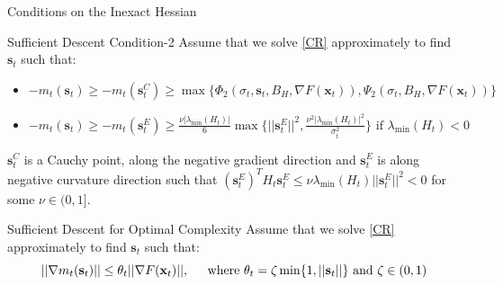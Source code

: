 \documentclass[10pt]{beamer}
\newcommand{\g}{\nabla}
\newcommand{\xbold}{\mathbf{x}}
\newcommand{\sbold}{\mathbf{s}}
\newcommand{\mineig}{\lambda_{\min}}
\begin{document}
\begin{frame}{Conditions on the Inexact Hessian}
\begin{alertblock}{Sufficient Descent Condition-2}
Assume that we solve \ref{CR} approximately to find \(\sbold_{t}\) such that:
\begin{itemize}
\item \(-m_{t}(\sbold_{t}) \geq -m_{t}(\sbold_{t}^{C}) \geq \max\lbrace\Phi_{2}(\sigma_{t}, \sbold_{t}, B_{H}, \g F(\xbold_{t})), \Psi_{2}(\sigma_{t}, B_{H}, \g F(\xbold_{t}))\rbrace\)
\item \(-m_{t}(\sbold_{t}) \geq -m_{t}(\sbold_{t}^{E}) \geq \frac{\nu|\mineig(H_{t})|}{6} \max\lbrace ||\sbold_{t}^{E}||^{2}, \frac{\nu^{2}|\mineig(H_{t})|^{2}}{\sigma_{t}^{2}}\rbrace \text{ if } \mineig(H_{t}) < 0\)
\end{itemize}
\(\sbold_{t}^{C}\) is a Cauchy point, along the negative gradient direction and \(\sbold_{t}^{E}\) is along negative curvature direction such that \((\sbold_{t}^{E})^{T} H_{t} \sbold_{t}^{E} \leq \nu\mineig(H_{t})||\sbold_{t}^{E}||^{2} < 0\) for some \(\nu \in (0, 1]\).
\end{alertblock}
\pause
\begin{alertblock}{Sufficient Descent for Optimal Complexity}
Assume that we solve \ref{CR} approximately to find \(\sbold_{t}\) such that:
\[||\nabla m_{t}(\sbold_{t})|| \leq \theta_{t}||\g F(\xbold_{t})||, \hspace{4mm} \text{ where }\theta_{t} = \zeta\min\{1, ||\sbold_{t}||\} \text{ and } \zeta \in (0, 1) \]
\end{alertblock}
\end{frame}
\end{document}
